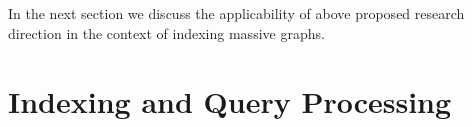 \documentclass{scrartcl}
\begin{document}
%
% 
%
%
%


%
%
%
%
%
%


In the next section we discuss the applicability of above proposed research direction in the context of indexing massive graphs.
\section{Indexing and Query Processing}
\end{document}
